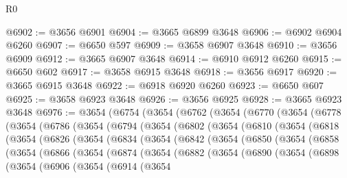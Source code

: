 \begin{lexlean}{R0}
\begin{coremodule}
@6902 := @3656 @6901
@6904 := @3665 @6899 @3648
@6906 := @6902 @6904 @6260
@6907 := @6650 @597
@6909 := @3658 @6907 @3648
@6910 := @3656 @6909
@6912 := @3665 @6907 @3648
@6914 := @6910 @6912 @6260
@6915 := @6650 @602
@6917 := @3658 @6915 @3648
@6918 := @3656 @6917
@6920 := @3665 @6915 @3648
@6922 := @6918 @6920 @6260
@6923 := @6650 @607
@6925 := @3658 @6923 @3648
@6926 := @3656 @6925
@6928 := @3665 @6923 @3648
@6976 := @3654
    (@6754
      (@3654
        (@6762
          (@3654
            (@6770
              (@3654
                (@6778
                  (@3654
                    (@6786
                      (@3654
                        (@6794
                          (@3654
                            (@6802
                              (@3654
                                (@6810
                                  (@3654
                                    (@6818
                                      (@3654
                                        (@6826
                                          (@3654
                                            (@6834
                                              (@3654
                                                (@6842
                                                  (@3654
                                                    (@6850
                                                      (@3654
                                                        (@6858
                                                          (@3654
                                                            (@6866
                                                              (@3654
                                                                (@6874
                                                                  (@3654
                                                                    (@6882
                                                                      (@3654
                                                                        (@6890
                                                                          (@3654
                                                                            (@6898
                                                                              (@3654
                                                                                (@6906
                                                                                  (@3654
                                                                                    (@6914
                                                                                      (@3654

\end{coremodule}
\end{lexlean}
